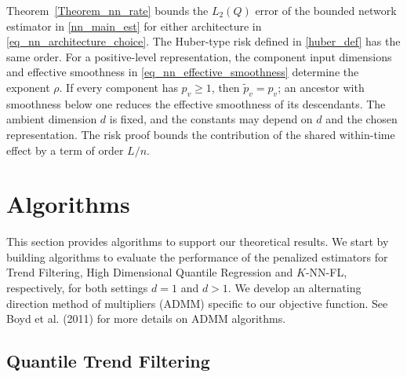 \documentclass[twoside,11pt]{article}
\newenvironment{revision}{\color{revisionred}}{}
\begin{document}
\begin{revision}
Theorem~\ref{Theorem_nn_rate} bounds the $L_2(Q)$ error of the
bounded network estimator in \eqref{nn_main_est} for either
architecture in \eqref{eq_nn_architecture_choice}.
The Huber-type risk defined in \eqref{huber_def} has the same
order. For a positive-level representation, the component input
dimensions and effective smoothness in
\eqref{eq_nn_effective_smoothness} determine the exponent
$\rho$. If every component has $p_v\geq1$, then
$\widetilde p_v=p_v$; an ancestor with smoothness below one
reduces the effective smoothness of its descendants.
The ambient dimension $d$ is fixed, and the constants may
depend on $d$ and the chosen representation.
The risk proof bounds the contribution of the shared
within-time effect by a term of order $L/n$.
\end{revision}

\section{Algorithms}
This section provides algorithms to support our theoretical results. We start by building algorithms to evaluate the performance of the penalized estimators for Trend Filtering, High Dimensional Quantile Regression and \( K \)-NN-FL, respectively, for both settings \( d = 1 \) and \( d > 1 \). 
We develop an alternating direction method of multipliers (ADMM) specific to our objective function. See Boyd et al. (2011) for more details on ADMM algorithms.
\subsection{Quantile Trend Filtering}
\end{document}
